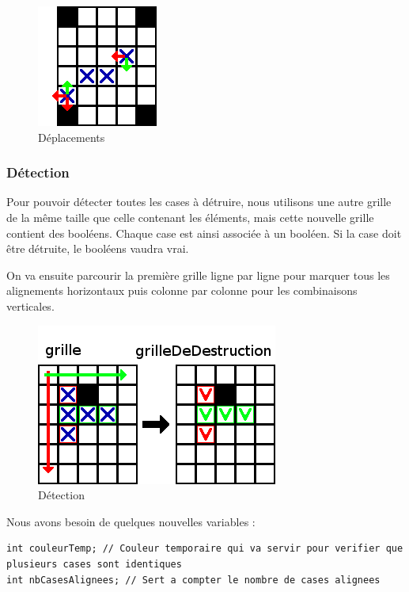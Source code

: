 \begin{figure}[position]
	\center
	\caption{\label{verifDepl} Déplacements}
	\includegraphics{imgs/verifDepl}
\end{figure}
		
\subsubsection{Détection}	
	
Pour pouvoir détecter toutes les cases à détruire, nous utilisons une autre grille de la même taille que celle contenant les éléments, mais cette nouvelle grille contient des booléens. Chaque case est ainsi associée à un booléen. Si la case doit être détruite, le booléens vaudra vrai.

On va ensuite parcourir la première grille ligne par ligne pour marquer tous les alignements horizontaux puis colonne par colonne pour les combinaisons verticales.

\begin{figure}[position]
	\center
	\caption{\label{Detection} Détection}
	\includegraphics{imgs/Detection}
\end{figure}

Nous avons besoin de quelques nouvelles variables :

\begin{lstlisting}
int couleurTemp; // Couleur temporaire qui va servir pour verifier que plusieurs cases sont identiques
int nbCasesAlignees; // Sert a compter le nombre de cases alignees
\end{lstlisting}

